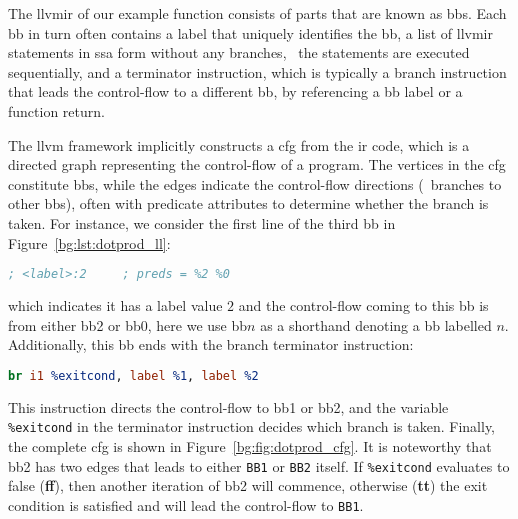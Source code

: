 The \gls{llvmir} of our example function consists of parts that are known
as \glspl{bb}.  Each \gls{bb} in turn often contains a label that uniquely
identifies the \gls{bb}, a list of \gls{llvmir} statements in \gls{ssa} form
without any branches, \ie~the statements are executed sequentially, and a
terminator instruction, which is typically a branch instruction that leads the
control-flow to a different \gls{bb}, by referencing a \gls{bb} label or a
function return.

The \gls{llvm} framework implicitly constructs a \gls{cfg} from the
\gls{ir} code, which is a directed graph representing the control-flow of
a program.  The vertices in the \gls{cfg} constitute \glspl{bb}, while
the edges indicate the control-flow directions (\ie~branches to other
\glspl{bb}), often with predicate attributes to determine whether the branch
is taken.  For instance, we consider the first line of the third \gls{bb} in
Figure~\ref{bg:lst:dotprod_ll}:
\begin{lstlisting}[language=LLVM]
    ; <label>:2     ; preds = %2 %0
\end{lstlisting}\vspace{-15pt}
which indicates it has a label value $2$ and the control-flow coming to this
\gls{bb} is from either \gls{bb}2 or \gls{bb}0, here we use \gls{bb}$n$ as a
shorthand denoting a \gls{bb} labelled $n$.  Additionally, this \gls{bb} ends
with the branch terminator instruction:
\begin{lstlisting}[language=LLVM]
    br i1 %exitcond, label %1, label %2
\end{lstlisting}\vspace{-15pt}
This instruction directs the control-flow to \gls{bb}1 or \gls{bb}2,
and the variable \verb|%exitcond| in the terminator instruction decides
which branch is taken.  Finally, the complete \gls{cfg} is shown in
Figure~\ref{bg:fig:dotprod_cfg}.  It is noteworthy that \gls{bb}2 has two edges
that leads to either \verb|BB1| or \verb|BB2| itself.  If \verb|%exitcond|
evaluates to false (\textbf{ff}), then another iteration of \gls{bb}2 will
commence, otherwise (\textbf{tt}) the exit condition is satisfied and will lead
the control-flow to \verb|BB1|.
